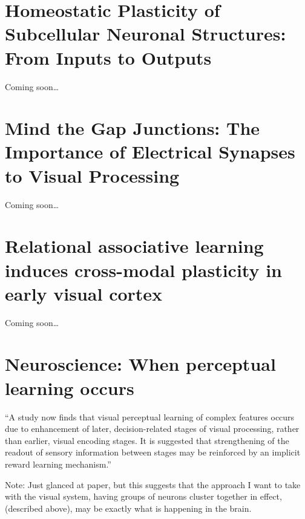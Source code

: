 \documentclass[11pt, a4paper, oneside]{article}   	%
\begin{document}


\section{Homeostatic Plasticity of Subcellular Neuronal Structures: From Inputs to Outputs \cite{Wefelmeyer2016}}

Coming soon\ldots

\section{Mind the Gap Junctions: The Importance of Electrical Synapses to Visual Processing \cite{Demb2016}}

Coming soon\ldots

\section{Relational associative learning induces cross-modal plasticity in early visual cortex \cite{Headley2015}}

Coming soon\ldots

\section{Neuroscience: When perceptual learning occurs \cite{Sasaki2017}}

``A study now finds that visual perceptual learning of complex features occurs due to enhancement of later, decision-related stages of visual processing, rather than earlier, visual encoding stages. It is suggested that strengthening of the readout of sensory information between stages may be reinforced by an implicit reward learning mechanism.''


Note: Just glanced at paper, but this suggests that the approach I want to take with the visual system, having groups of neurons cluster together in effect, (described above), may be exactly what is happening in the brain.
\end{document}
